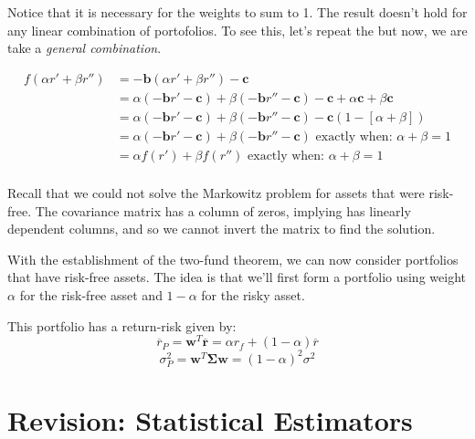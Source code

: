 Notice that it is necessary for the weights to sum to 1. 
The result doesn't hold for any linear combination of portofolios. 
To see this, let's repeat the but now, we are take a 
\textit{general combination}. 


\[
\begin{array}{ll}
f(\alpha r' + \beta r'') 
&= -\bm{b} (\alpha r' + \beta r'') - \bm{c} \\
&=  \alpha (- \bm{b} r' - \bm{c}) + \beta(-\bm{b}r'' - \bm{c}) - \bm{c} + \alpha \bm{c} + \beta\bm{c} \\
&=  \alpha (- \bm{b} r' - \bm{c}) + \beta(-\bm{b}r'' - \bm{c}) - \bm{c} ( 1- [\alpha + \beta])  \\
&=  \alpha (- \bm{b} r' - \bm{c}) + \beta(-\bm{b}r'' - \bm{c}) \text{ exactly when: } \alpha+\beta = 1 \\
&=  \alpha f(r') + \beta f(r'') \text{ exactly when: } \alpha+\beta = 1 \\
\end{array}
\]

\frmrule

Recall that we could not solve the Markowitz problem 
for assets that were risk-free. The covariance matrix has 
a column of zeros, implying has linearly dependent columns, 
and so we cannot invert the matrix to find the solution. 

With the establishment of the two-fund theorem, 
we can now consider portfolios that have risk-free assets. 
The idea is that we'll first form a portfolio using weight $\alpha$ 
for the risk-free asset and $1-\alpha$ for the risky asset. 

This portfolio has a return-risk given by:
$$\overline{r}_P = \bm{w}^{T}\overline{\bm{r}} = \alpha r_f + (1-\alpha)\overline{r}$$
$$\sigma^{2}_P = \bm{w}^{T} \bm{\Sigma}\bm{w} = (1-\alpha)^{2}\sigma^{2}$$





\section{Revision: Statistical Estimators}


